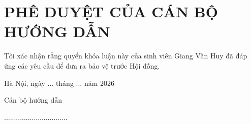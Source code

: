 \chapter*{PHÊ DUYỆT CỦA CÁN BỘ HƯỚNG DẪN}
\fontsize{13}{15}\selectfont

Tôi xác nhận rằng quyển khóa luận này của sinh viên Giang Văn Huy đã đáp ứng các yêu cầu để đưa ra bảo vệ trước Hội đồng.

\vspace{1cm}

\begin{flushright}
    Hà Nội, ngày ... tháng ... năm 2026 \par
    Cán bộ hướng dẫn\hspace*{1.4cm}\par
    \vspace{2.5cm}
    ................................\hspace*{1cm}
\end{flushright}
